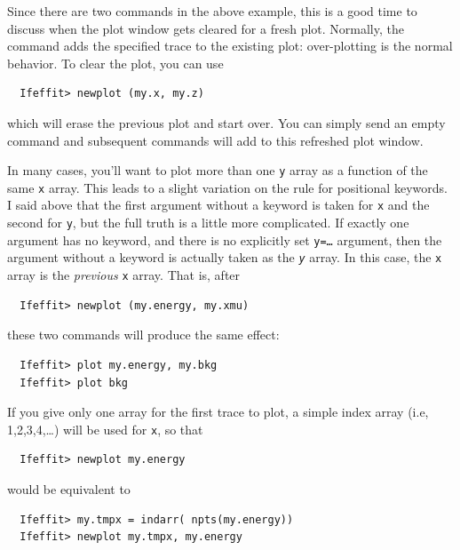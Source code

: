 Since there are two {} commands in the above example, this is a
good time to discuss when the plot window gets cleared for a fresh plot.
Normally, the {} command adds the specified trace to the
existing plot: over-plotting is the normal behavior.  To clear the plot, you
can use
\begin{verbatim}
  Ifeffit> newplot (my.x, my.z)
\end{verbatim}
\noindent
which will erase the previous plot and start over.  You can simply send an
empty {} command and subsequent {} commands will
add to this refreshed plot window.

In many cases, you'll want to plot more than one {\tt{y}} array as a
function of the same {\tt{x}} array. This leads to a slight variation on
the rule for positional keywords.  I said above that the first argument
without a keyword is taken for {\tt{x}} and the second for {\tt{y}}, but
the full truth is a little more complicated.  If exactly one argument has
no keyword, and there is no explicitly set {\tt{y=\ldots}} argument, then
the argument without a keyword is actually taken as the {\emph\tt{y}}
array. In this case, the {\tt{x}} array is the {\emph{previous}} {\tt{x}}
array.  That is, after
\begin{verbatim}
  Ifeffit> newplot (my.energy, my.xmu)
\end{verbatim}
\noindent
these two commands will produce the same effect:
\begin{verbatim}
  Ifeffit> plot my.energy, my.bkg
  Ifeffit> plot bkg
\end{verbatim}
\noindent
If you give only one array for the first trace to plot, a simple index
array (i.e, 1,2,3,4,\ldots) will be used for {\tt{x}}, so that
\begin{verbatim}
  Ifeffit> newplot my.energy
\end{verbatim}
\noindent
would be equivalent to
\begin{verbatim}
  Ifeffit> my.tmpx = indarr( npts(my.energy))
  Ifeffit> newplot my.tmpx, my.energy
\end{verbatim}
\noindent

